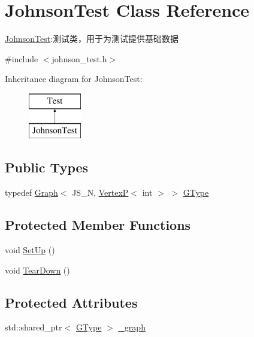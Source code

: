 \hypertarget{class_johnson_test}{}\section{Johnson\+Test Class Reference}
\label{class_johnson_test}


\hyperlink{class_johnson_test}{Johnson\+Test}\+:测试类，用于为测试提供基础数据  




{\ttfamily \#include $<$johnson\+\_\+test.\+h$>$}

Inheritance diagram for Johnson\+Test\+:\begin{figure}[H]
\begin{center}
\leavevmode
\includegraphics[height=2.000000cm]{class_johnson_test}
\end{center}
\end{figure}
\subsection*{Public Types}
\begin{DoxyCompactItemize}
\item 
typedef \hyperlink{struct_introduction_to_algorithm_1_1_graph_algorithm_1_1_graph}{Graph}$<$ J\+S\+\_\+\+N, \hyperlink{struct_introduction_to_algorithm_1_1_graph_algorithm_1_1_vertex_p}{Vertex\+P}$<$ int $>$ $>$ \hyperlink{class_johnson_test_ac738b463d046ce889761224801f56372}{G\+Type}
\end{DoxyCompactItemize}
\subsection*{Protected Member Functions}
\begin{DoxyCompactItemize}
\item 
void \hyperlink{class_johnson_test_a5bcc9c920ffcb948a3c3262e33824743}{Set\+Up} ()
\item 
void \hyperlink{class_johnson_test_a19afeaec81c858f848cabc90c64e52b8}{Tear\+Down} ()
\end{DoxyCompactItemize}
\subsection*{Protected Attributes}
\begin{DoxyCompactItemize}
\item 
std\+::shared\+\_\+ptr$<$ \hyperlink{class_johnson_test_ac738b463d046ce889761224801f56372}{G\+Type} $>$ \hyperlink{class_johnson_test_ae571863596ab15d90ed03c7f192030a3}{\+\_\+graph}
\end{DoxyCompactItemize}


